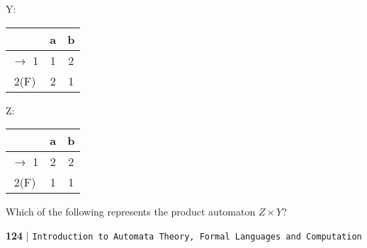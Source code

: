 \documentclass{article}
\begin{document}
\begin{multicols}{2}
Y:
\begin{center}
\begin{tabular}{|c|c|c|}

\hline
  & a & b \\
\hline
$\rightarrow$ 1 & 1 & 2 \\
\hline
2(F) & 2 & 1 \\
\hline

\end{tabular}
\end{center}


Z:
\begin{center}
\begin{tabular}{|c|c|c|}

\hline
  & a & b \\
\hline
$\rightarrow$ 1 & 2 & 2 \\
\hline
2(F) & 1 & 1 \\
\hline

\end{tabular}
\end{center}
\end{multicols}

\vspace*{0.2cm}

\hspace{0.5cm}
Which of the following represents the product automaton $Z \times Y$?\\

\vspace*{0.2cm}

\newpage
 \begin{flushleft}
    \textbf{124}\hspace*{0.1cm} \textbf{$|$} \hspace*{0.1cm} \texttt{Introduction to Automata Theory, Formal Languages and Computation}
  \end{flushleft}
\vspace*{0.4cm}
\end{document}
